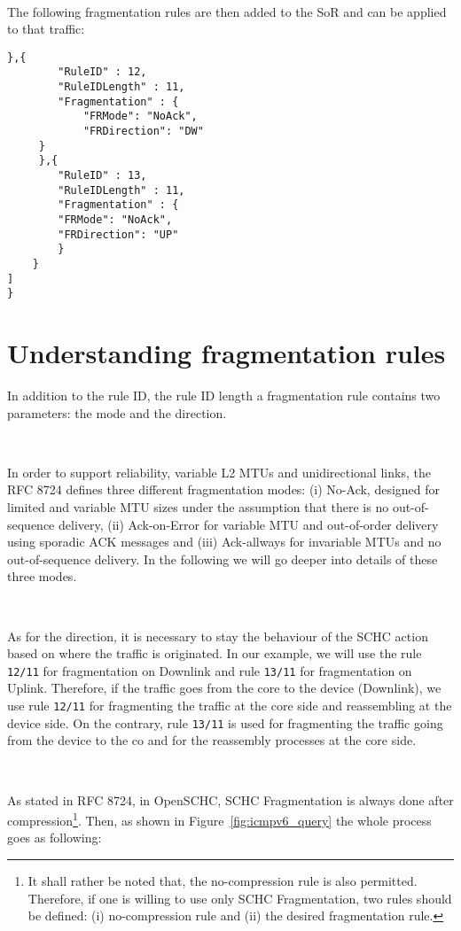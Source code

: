 \documentclass[onecolumn,12pt]{book}
\newcounter{c}
\begin{document}
~

The following fragmentation rules are then added to the SoR and can be applied to that traffic:

\begin{lstlisting}[caption={Fragmentation Rules in rule icmp2.json}, backgroundcolor=\color{yellow}, basicstyle=\ttfamily\small, label=rule-icmp2]
	 },{
		"RuleID" : 12,
		"RuleIDLength" : 11,
		"Fragmentation" : {
			"FRMode": "NoAck",
			"FRDirection": "DW"
	 }
	 },{	
		"RuleID" : 13,
		"RuleIDLength" : 11,
		"Fragmentation" : {
		"FRMode": "NoAck",
		"FRDirection": "UP"
		} 
    }
]
}
\end{lstlisting}

\section{Understanding fragmentation rules}

In addition to the rule ID, the rule ID length a fragmentation rule contains two  parameters: the mode and the direction.

~

In order to support reliability, variable L2 MTUs and unidirectional links, the RFC 8724 defines three different fragmentation modes: (i) No-Ack, designed for limited and variable MTU sizes under the assumption that there is no out-of-sequence delivery, (ii) Ack-on-Error for variable MTU and out-of-order delivery using sporadic ACK messages and (iii) Ack-allways for invariable MTUs and no out-of-sequence delivery.
In the following we will go deeper into details of these three modes.

~

As for the direction, it is necessary to stay the behaviour of the SCHC action based on where the traffic is originated.
In our example, we will use the rule \texttt{12/11} for fragmentation on Downlink and rule \texttt{13/11} for fragmentation on Uplink.
Therefore, if the traffic goes from the core to the device (Downlink), we use rule \texttt{12/11} for fragmenting the traffic at the core side and reassembling at the device side.
On the contrary, rule \texttt{13/11} is used for fragmenting the traffic going from the device to the co and for the reassembly processes at the core side.

~

As stated in RFC 8724, in OpenSCHC, SCHC Fragmentation is always done after compression\footnote{It shall rather be noted that, the no-compression rule is also permitted. Therefore, if one is willing to use only SCHC Fragmentation, two rules should be defined: (i) no-compression rule and (ii) the desired fragmentation rule.}. 
Then, as shown in Figure~\ref{fig:icmpv6_query} the whole process goes as following:
\end{document}
